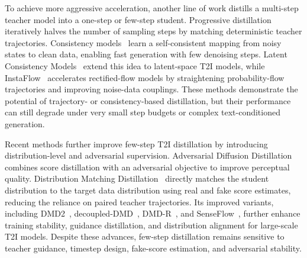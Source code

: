 \documentclass{llmxive}
\begin{document}
To achieve more aggressive acceleration, another line of work distills a multi-step teacher model into a one-step or few-step student. Progressive distillation~\citep{progressivedistill} iteratively halves the number of sampling steps by matching deterministic teacher trajectories. Consistency models~\citep{consistency} learn a self-consistent mapping from noisy states to clean data, enabling fast generation with few denoising steps. Latent Consistency Models~\citep{latentconsistency} extend this idea to latent-space T2I models, while InstaFlow~\citep{liu2023instaflow} accelerates rectified-flow models by straightening probability-flow trajectories and improving noise-data couplings. These methods demonstrate the potential of trajectory- or consistency-based distillation, but their performance can still degrade under very small step budgets or complex text-conditioned generation.

Recent methods further improve few-step T2I distillation by introducing distribution-level and adversarial supervision. Adversarial Diffusion Distillation~\citep{add} combines score distillation with an adversarial objective to improve perceptual quality. Distribution Matching Distillation~\citep{dmd} directly matches the student distribution to the target data distribution using real and fake score estimates, reducing the reliance on paired teacher trajectories. Its improved variants, including DMD2~\citep{yin2024improved}, decoupled-DMD~\citep{decoupleddmd}, DMD-R~\citep{dmdr}, and SenseFlow~\citep{senseflow}, further enhance training stability, guidance distillation, and distribution alignment for large-scale T2I models. Despite these advances, few-step distillation remains sensitive to teacher guidance, timestep design, fake-score estimation, and adversarial stability.
\end{document}
